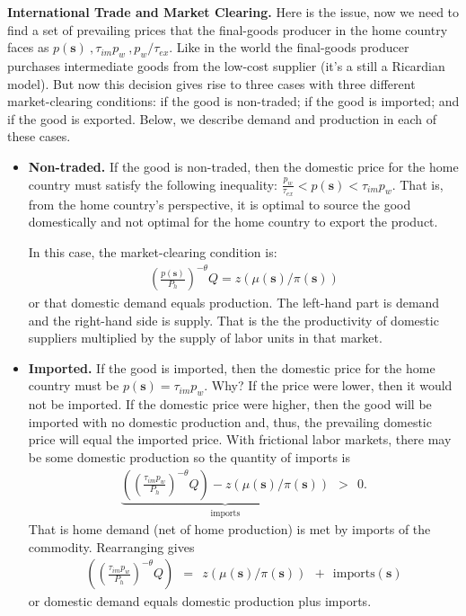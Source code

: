 \documentclass[pdftex,12pt]{article}
\begin{document}
\medskip
\noindent \textbf{International Trade and Market Clearing.} Here is the issue, now we need to find a set of prevailing prices that the final-goods producer in the home country faces as $ p(\textbf{s}) \ , \tau_{im} p_w \ , p_w / \tau_{ex}$. Like in the \citet{eaton2002technology} world the final-goods producer purchases intermediate goods from the low-cost supplier (it's a still a Ricardian model). But now this decision gives rise to three cases with three different market-clearing conditions: if the good is non-traded; if the good is imported; and if the good is exported. Below, we describe demand and production in each of these cases.
\begin{itemize}
\item \textbf{Non-traded.} If the good is non-traded, then the domestic price for the home country must satisfy the following inequality: $\frac{p_w}{\tau_{ex}} < p(\textbf{s}) <  \tau_{im} p_w$. That is, from the home country's perspective, it is optimal to source the good domestically and not optimal for the home country to export the product.

    In this case, the market-clearing condition is:
    \begin{align}
\left(\frac{p(\textbf{s})}{P_h}\right)^{-\theta}Q=  z \left( \mu(\textbf{s}) / \pi(\textbf{s}) \right)
\label{eq:non_traded_mc_soe}
    \end{align}
    or that domestic demand equals production. The left-hand part is demand and the right-hand side is supply. That is the the productivity of domestic suppliers multiplied by the supply of labor units in that market.


\item \textbf{Imported.} If the good is imported, then the domestic price for the home country must be $p(\textbf{s}) =  \tau_{im} p_w$. Why? If the price were lower, then it would not be imported. If the domestic price were higher, then the good will be imported with no domestic production and, thus, the prevailing domestic price will equal the imported price. With frictional labor markets, there may be some domestic production so the quantity of imports is
    \begin{align}
 \underbrace{ \left(\left(\frac{\tau_{im} p_w}{P_h}\right)^{-\theta}Q \right) - z\left( \mu(\textbf{s}) / \pi(\textbf{s})\right)}_{\mbox{imports}} \ \ > \ \ 0.
\label{eq:imported_mc_soe}
    \end{align}
    That is home demand (net of home production) is met by imports of the commodity. Rearranging gives
 \begin{align}
 \left(\left(\frac{\tau_{im} p_w}{P_h}\right)^{-\theta}Q \right) \ \ = \ \ z\left( \mu(\textbf{s}) / \pi(\textbf{s})\right) \ \ + \ \  \mbox{imports}(\textbf{s})
\label{eq:imported_mc_soe_im}
 \end{align}
or domestic demand equals domestic production plus imports.



\end{itemize}
\end{document}
